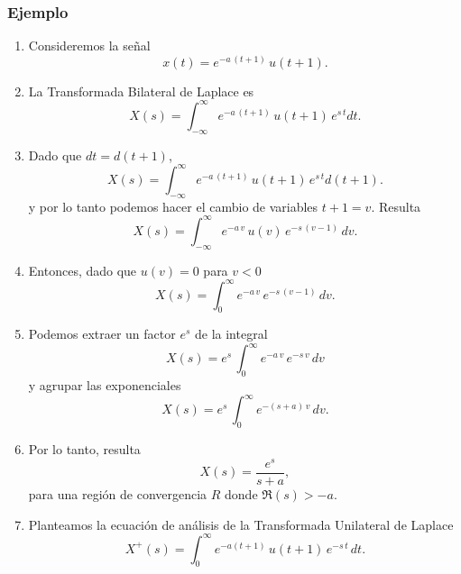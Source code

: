\subsubsection{Ejemplo}

\begin{enumerate}

\item Consideremos la se\~{n}al
\begin{equation}
        x(t) = e^{-a \, (t+1)} \, u(t+1).
\end{equation}

\item La Transformada Bilateral de Laplace es
\begin{equation}
 X(s) = \int_{-\infty}^{\infty} e^{-a \, (t+1)} \, u(t+1) \, e^{s \, t} dt.
\end{equation}

\item Dado que $dt = d(t+1)$,
\begin{equation}
 X(s) = \int_{-\infty}^{\infty} e^{-a \, (t+1)} \, u(t+1) \, e^{s \, t} d(t+1).
\end{equation}
y por lo tanto podemos hacer el cambio de variables $t+1 = v$. Resulta
\begin{equation}
 X(s) = \int_{-\infty}^{\infty} e^{-a \, v} \, u(v) \, e^{-s \, (v-1)} \, dv.
\end{equation}

\item Entonces, dado que $u(v) = 0$ para $v < 0$
\begin{equation}
 X(s) = \int_{0}^{\infty} e^{-a \, v} \, e^{-s \, (v-1)} \, dv.
\end{equation}

\item
Podemos extraer un factor $e^{s}$ de la integral
\begin{equation}
 X(s) = e^{s} \, \int_{0}^{\infty} e^{-a \, v} \, e^{-s \, v} \, dv
\end{equation}
y agrupar las exponenciales
\begin{equation}
 X(s) = e^{s} \, \int_{0}^{\infty} e^{-(s + a) \, v} \, dv.
\end{equation}

\item Por lo tanto, resulta
\begin{equation}
  X(s) = \frac{e^{s}}{s+a},
\end{equation}
para una región de convergencia $R$ donde $\Re(s) > -a$.

\item Planteamos la ecuaci\'{o}n de an\'{a}lisis de la Transformada Unilateral de Laplace
\begin{equation}
  X^{+}(s) = \int_{0}^{\infty} e^{-a (t+1)} \, u(t+1) \, e^{-s \, t} \, dt.
\end{equation}


\end{enumerate}
